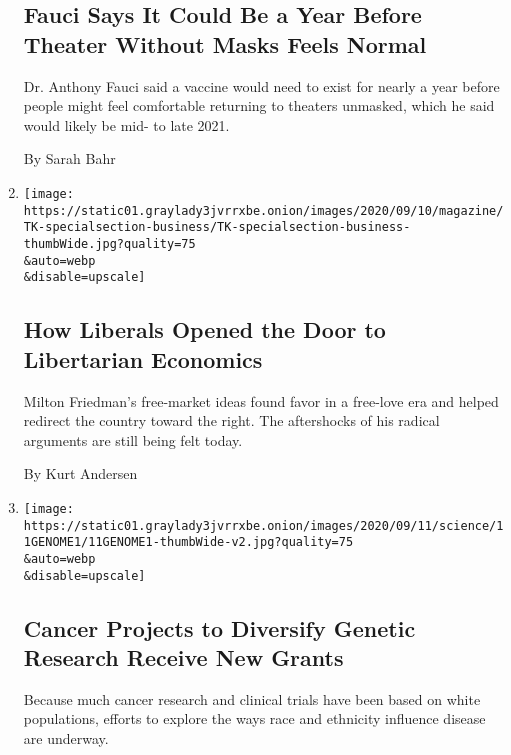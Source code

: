 \begin{enumerate}
{  \subsection{Fauci Says It Could Be a Year Before Theater Without Masks
  Feels
  Normal}\label{fauci-says-it-could-be-a-year-before-theater-without-masks-feels-normal}}

  Dr. Anthony Fauci said a vaccine would need to exist for nearly a year
  before people might feel comfortable returning to theaters unmasked,
  which he said would likely be mid- to late 2021.

  By Sarah Bahr
\item
  \href{/2020/09/11/business/dealbook/milton-friedman-free-markets.html}{}

  \texttt{[image: https://static01.graylady3jvrrxbe.onion/images/2020/09/10/magazine/TK-specialsection-business/TK-specialsection-business-thumbWide.jpg?quality=75\\\&auto=webp\\\&disable=upscale]}

  \hypertarget{how-liberals-opened-the-door-to-libertarian-economics}{%
  \subsection{How Liberals Opened the Door to Libertarian
  Economics}\label{how-liberals-opened-the-door-to-libertarian-economics}}

  Milton Friedman's free-market ideas found favor in a free-love era and
  helped redirect the country toward the right. The aftershocks of his
  radical arguments are still being felt today.

  By Kurt Andersen
\item
  \href{/2020/09/11/science/genetic-cancer-research-race.html}{}

  \texttt{[image: https://static01.graylady3jvrrxbe.onion/images/2020/09/11/science/11GENOME1/11GENOME1-thumbWide-v2.jpg?quality=75\\\&auto=webp\\\&disable=upscale]}

  \hypertarget{cancer-projects-to-diversify-genetic-research-receive-new-grants}{%
  \subsection{Cancer Projects to Diversify Genetic Research Receive New
  Grants}\label{cancer-projects-to-diversify-genetic-research-receive-new-grants}}

  Because much cancer research and clinical trials have been based on
  white populations, efforts to explore the ways race and ethnicity
  influence disease are underway.


\end{enumerate}
